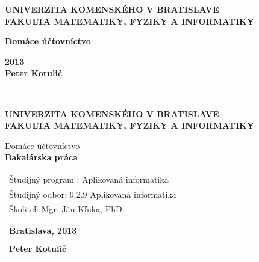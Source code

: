 \documentclass[12pt,onesided]{book}
\def\mftitle{Domáce účtovníctvo}
\def\mfthesistype{Bakalárska práca}
\def\mfauthor{Peter Kotulič}
\def\mfadvisor{Mgr. Ján Kľuka, PhD.}
\def\mfplacedate{Bratislava, 2013}
\begin{document}
\frontmatter

\thispagestyle{empty}

\noindent
\begin{minipage}{1\textwidth}
\begin{center}
\large\bf UNIVERZITA KOMENSKÉHO V BRATISLAVE\\
FAKULTA MATEMATIKY, FYZIKY A INFORMATIKY\\
\end{center}
\end{minipage}

\vfill
\begin{minipage}{0.8\textwidth}
\begin{center}
\LARGE\bf\sc\mftitle
\end{center}
\end{minipage}
\vfill
{\large\bf 2013}\\

{\large\bf \mfauthor}
\eject

\thispagestyle{empty}~\vfill\eject

\thispagestyle{empty}

\noindent
\begin{minipage}{1\textwidth}
\begin{center}
\large\bf UNIVERZITA KOMENSKÉHO V BRATISLAVE\\
FAKULTA MATEMATIKY, FYZIKY A INFORMATIKY
\end{center}
\end{minipage}
\vfill
\begin{minipage}{0.8\textwidth}
\begin{center}
\LARGE\sc\mftitle \\
\smallskip
\large\bf\mfthesistype
\end{center}
\end{minipage}
\vfill

\begin{table}[h]
  \begin{tabular}{ l }
	Študijný program : Aplikovaná informatika\\
	Študijný odbor: 9.2.9 Aplikovaná informatika\\
	Školiteľ: \mfadvisor \\
	\\
	\\	
	{\large\bf\mfplacedate}\\
	\\
	{\large\bf\mfauthor}
  \end{tabular}
\end{table}
\end{document}
